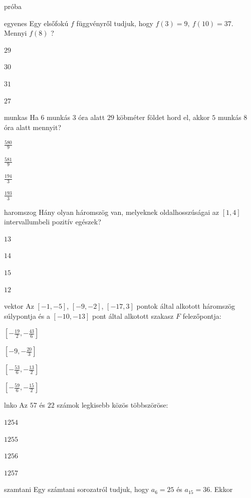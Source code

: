 \documentclass[12pt]{article}
\begin{document}
\begin{quiz}{próba}

\begin{multi}{egyenes}
Egy elsőfokú $f$ függvényről tudjuk, hogy $f(3)=9,\ f(10)=37$. Mennyi $f(8)$ ?
\item* $29$
\item  $30$
\item  $31$
\item  $27$
\end{multi}
\begin{multi}{munkas}
Ha $6$ munkás $3$ óra alatt $29$ köbméter földet hord el, akkor
$5$ munkás $8$ óra alatt mennyit? 

\item* $\frac{580}{9}$
\item  $\frac{581}{9}$
\item  $\frac{194}{3}$
\item  $\frac{193}{3}$
\end{multi}
\begin{multi}{haromszog}
Hány olyan háromszög van, melyeknek oldalhosszúságai az $[1,4]$ 
intervallumbeli pozitív egészek?
\item* $13$
\item  $14$
\item  $15$
\item  $12$
\end{multi}
\begin{multi}{vektor}
Az $\left[-1, -5\right]$, $\left[-9, -2\right]$, $\left[-17, 3\right]$ pontok által alkotott háromszög súlypontja és a $\left[-10, -13\right]$ pont 
által alkotott szakasz $F$ felezőpontja:
\item* $\left[-\frac{19}{2}, -\frac{43}{6}\right]$
\item  $\left[-9, -\frac{20}{3}\right]$
\item  $\left[-\frac{53}{6}, -\frac{13}{2}\right]$
\item  $\left[-\frac{59}{6}, -\frac{15}{2}\right]$
\end{multi}
\begin{multi}{lnko}
Az $57$ és $22$ számok legkisebb közös többszöröse:
\item* $1254$
\item  $1255$
\item  $1256$
\item  $1257$
\end{multi}
\begin{multi}{szamtani}
Egy számtani sorozatról tudjuk, hogy $a_{6}=25$ és $a_{15}=36$. Ekkor 

\end{multi}
\end{quiz}
\end{document}
